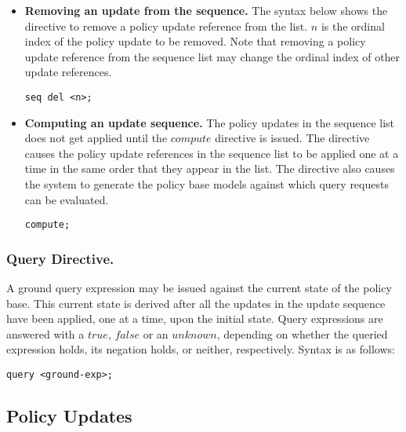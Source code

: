 \documentclass{llncs}
\begin{document}
\begin{itemize}
          \vspace{1mm}
          \item
            {\bf Removing an update from the sequence.} The syntax below
            shows the directive to remove a policy update reference from the
            list. $n$ is the ordinal index of the policy update to be
            removed. Note that removing a policy update reference from the
            sequence list may change the ordinal index of other update
            references.
                                                                
            \begin{verbatim}seq del <n>;\end{verbatim}

          \vspace{1mm}
          \item
            {\bf Computing an update sequence.} The policy updates in the
            sequence list does not get applied until the $compute$ directive
            is issued. The directive causes the policy update references in
            the sequence list to be applied one at a time in the same order
            that they appear in the list. The directive also causes the
            system to generate the policy base models against which query
            requests can be evaluated.

           \begin{verbatim}compute;\end{verbatim}
        \end{itemize}

      \subsubsection{Query Directive.}

        A ground query expression may be issued against the current state of
        the policy base. This current state is derived after all the updates
        in the update sequence have been applied, one at a time, upon the
        initial state. Query expressions are answered with a $true$, $false$
        or an $unknown$, depending on whether the queried expression holds,
        its negation holds, or neither, respectively. Syntax is as follows:

        \begin{verbatim}query <ground-exp>;\end{verbatim}

    \subsection{Policy Updates}
\end{document}
